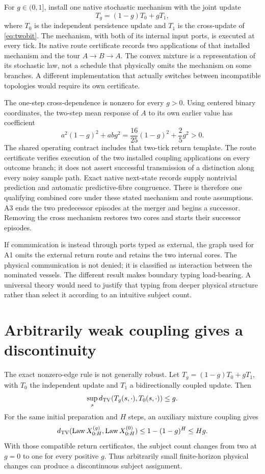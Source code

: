 For $g\in(0,1]$, install one native stochastic mechanism with the joint update
\[
T_g=(1-g)T_0+gT_1,
\]
where $T_0$ is the independent persistence update and $T_1$ is the cross-update of \cref{eq:twobit}. The mechanism, with both of its internal input ports, is executed at every tick. Its native route certificate records two applications of that installed mechanism and the tour $A\to B\to A$. The convex mixture is a representation of its stochastic law, not a schedule that physically omits the mechanism on some branches. A different implementation that actually switches between incompatible topologies would require its own certificate.

The one-step cross-dependence is nonzero for every $g>0$. Using centered binary coordinates, the two-step mean response of $A$ to its own earlier value has coefficient
\[
a^2(1-g)^2+abg^2
=\frac{16}{25}(1-g)^2+\frac25g^2>0.
\]
The shared operating contract includes that two-tick return template. The route certificate verifies execution of the two installed coupling applications on every outcome branch; it does not assert successful transmission of a distinction along every noisy sample path. Exact native next-state records supply nontrivial prediction and automatic predictive-fibre congruence. There is therefore one qualifying combined core under these stated mechanism and route assumptions. A3 ends the two predecessor episodes at the merger and begins a successor. Removing the cross mechanism restores two cores and starts their successor episodes.

If communication is instead through ports typed as external, the graph used for A1 omits the external return route and retains the two internal cores. The physical communication is not denied; it is classified as interaction between the nominated vessels. The different result makes boundary typing load-bearing. A universal theory would need to justify that typing from deeper physical structure rather than select it according to an intuitive subject count.

\section{Arbitrarily weak coupling gives a discontinuity}\label{section:split:arbitrarily-weak-coupling-gives-a-discontinuity}
The exact nonzero-edge rule is not generally robust. Let $T_g=(1-g)T_0+gT_1$, with $T_0$ the independent update and $T_1$ a bidirectionally coupled update. Then
\[
\sup_sd_{\mathrm{TV}}(T_g(s,\cdot),T_0(s,\cdot))\le g.
\]
For the same initial preparation and $H$ steps, an auxiliary mixture coupling gives
\begin{equation}\label{eq:weakcoupling}
d_{\mathrm{TV}}(\operatorname{Law} X^{(g)}_{0:H},\operatorname{Law} X^{(0)}_{0:H})
\le1-(1-g)^H\le Hg.
\end{equation}
With those compatible return certificates, the subject count changes from two at $g=0$ to one for every positive $g$. Thus arbitrarily small finite-horizon physical changes can produce a discontinuous subject assignment.

